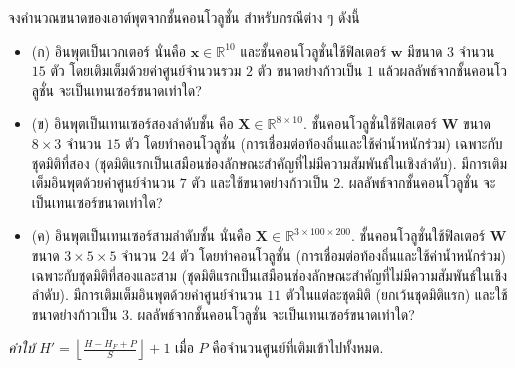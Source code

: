 \begin{Exercise}
	\label{ex: convolution output with padding}


จงคำนวณขนาดของเอาต์พุตจากชั้นคอนโวลูชั่น สำหรับกรณีต่าง ๆ ดังนี้ 
\begin{itemize}
	\item (ก) อินพุตเป็นเวกเตอร์ นั่นคือ $\bm{x} \in \mathbb{R}^{10}$
	และชั้นคอนโวลูชั่นใช้ฟิลเตอร์ $\bm{w}$ มีขนาด $3$ จำนวน $15$ ตัว โดยเติมเต็มด้วยค่าศูนย์จำนวนรวม $2$ ตัว
	ขนาดย่างก้าวเป็น $1$ แล้วผลลัพธ์จากชั้นคอนโวลูชั่น จะเป็นเทนเซอร์ขนาดเท่าใด?
	
	\item (ข) อินพุตเป็นเทนเซอร์สองลำดับชั้น คือ $\bm{X} \in \mathbb{R}^{8 \times 10}$.
	ชั้นคอนโวลูชั่นใช้ฟิลเตอร์ $\bm{W}$ ขนาด $8 \times 3$ จำนวน $15$ ตัว
	โดยทำคอนโวลูชั่น (การเชื่อมต่อท้องถิ่นและใช้ค่าน้ำหนักร่วม) เฉพาะกับชุดมิติที่สอง (ชุดมิติแรกเป็นเสมือนช่องลักษณะสำคัญที่ไม่มีความสัมพันธ์ในเชิงลำดับ).
	มีการเติมเต็มอินพุตด้วยค่าศูนย์จำนวน $7$ ตัว และใช้ขนาดย่างก้าวเป็น $2$.
	ผลลัพธ์จากชั้นคอนโวลูชั่น จะเป็นเทนเซอร์ขนาดเท่าใด?
	
	\item (ค) อินพุตเป็นเทนเซอร์สามลำดับชั้น นั่นคือ $\bm{X} \in \mathbb{R}^{3 \times 100 \times 200}$.
	ชั้นคอนโวลูชั่นใช้ฟิลเตอร์ $\bm{W}$ ขนาด $3 \times 5 \times 5$ จำนวน $24$ ตัว
	โดยทำคอนโวลูชั่น (การเชื่อมต่อท้องถิ่นและใช้ค่าน้ำหนักร่วม) เฉพาะกับชุดมิติที่สองและสาม
	(ชุดมิติแรกเป็นเสมือนช่องลักษณะสำคัญที่ไม่มีความสัมพันธ์ในเชิงลำดับ).
	มีการเติมเต็มอินพุตด้วยค่าศูนย์จำนวน $11$ ตัวในแต่ละชุดมิติ (ยกเว้นชุดมิติแรก) และใช้ขนาดย่างก้าวเป็น $3$.
	ผลลัพธ์จากชั้นคอนโวลูชั่น จะเป็นเทนเซอร์ขนาดเท่าใด?
\end{itemize}
\textit{คำใบ้} $H' = \left\lfloor \frac{H - H_F + P}{S} \right\rfloor + 1$ เมื่อ $P$ คือจำนวนศูนย์ที่เติมเข้าไปทั้งหมด.

\end{Exercise}

